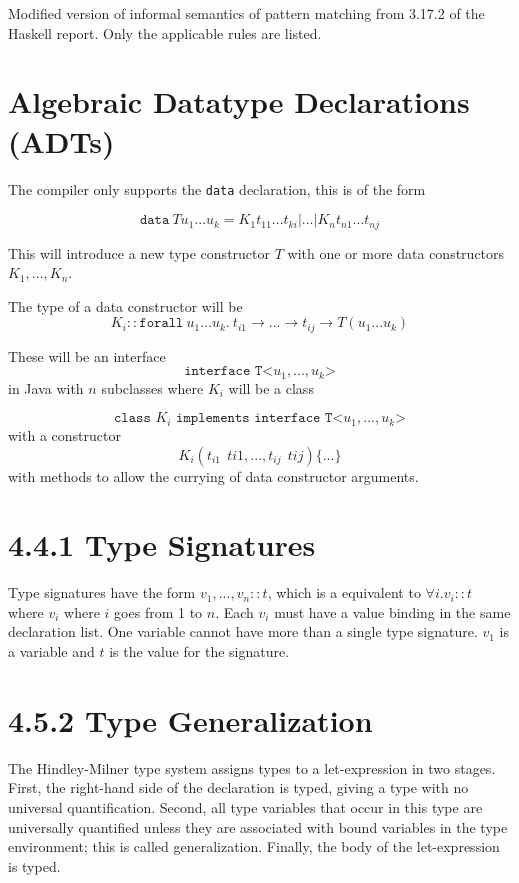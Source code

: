 \documentclass[12pt,a4paper,twoside]{article}
\begin{document}
    Modified version of informal semantics of pattern matching from 3.17.2 of the Haskell report. Only the applicable rules are listed.

\section{Algebraic Datatype Declarations (ADTs)}

The compiler only supports the \texttt{data} declaration, this is of the form

\[\texttt{data}\ T u_1...u_k = K_1 t_{11}...t_{ki} | ...| K_n t_{n1} ... t_{nj}\]

This will introduce a new type constructor $T$ with one or more data constructors $K_1,...,K_n$.

The type of a data constructor will be 
\[K_i :: \texttt{forall}\ u_1...u_k.\ t_{i1} \rightarrow ... \rightarrow t_{ij} \rightarrow T(u_1...u_k) \]

These will be an interface \[ \texttt{interface T<$u_1,...,u_k$>}\] in Java with $n$ subclasses where $K_i$ will be a class 

\[ \texttt{class $K_i$ implements interface T<$u_1,...,u_k$>} \] with a constructor \[K_i (t_{i1}\ \ ti1,...,t_{ij}\ \ tij)\{...\}\] with methods to allow
the currying of data constructor arguments.

\section{4.4.1 Type Signatures}

Type signatures have the form $v_1,...,v_n :: t$, which is a equivalent to $\forall i. v_i :: t$ where $v_i$ where $i$ goes from 1 to $n$. 
Each $v_i$ must have a value binding in the same declaration list.
One variable cannot have more than a single type signature. $v_1$ is a variable and $t$ is the value for the signature. 

\section{4.5.2 Type Generalization}

The Hindley-Milner type system assigns types to a let-expression in two stages. First, the right-hand side of the declaration is typed, 
giving a type with no universal quantification. Second, all type variables that occur in this type are universally 
quantified unless they are associated with bound variables in the type environment; this is called generalization. Finally, the body of the let-expression is typed.
\end{document}
